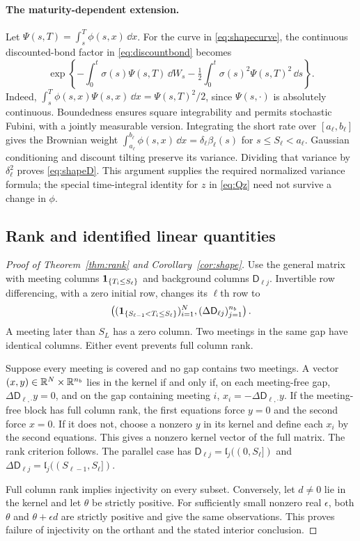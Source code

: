 \paragraph{The maturity-dependent extension.}
Let $\Psi(s,T)=\int_s^T\phi(s,x)\,\dd x$. For the curve in \eqref{eq:shapecurve}, the continuous discounted-bond factor in \eqref{eq:discountbond} becomes
\[
\exp\left\{-\int_0^t\sigma(s)\Psi(s,T)\,\dd W_s
            -\tfrac12\int_0^t\sigma(s)^2\Psi(s,T)^2\,\dd s\right\}.
\]
Indeed, $\int_s^T\phi(s,x)\Psi(s,x)\,\dd x=\Psi(s,T)^2/2$, since $\Psi(s,\cdot)$ is absolutely continuous. Boundedness ensures square integrability and permits stochastic Fubini, with a jointly measurable version. Integrating the short rate over $[a_\ell,b_\ell]$ gives the Brownian weight $\int_{a_\ell}^{b_\ell}\phi(s,x)\,\dd x=\delta_\ell\beta_\ell(s)$ for $s\leq S_\ell<a_\ell$. Gaussian conditioning and discount tilting preserve its variance. Dividing that variance by $\delta_\ell^2$ proves \eqref{eq:shapeD}. This argument supplies the required normalized variance formula; the special time-integral identity for $z$ in \eqref{eq:Qz} need not survive a change in $\phi$.

\subsection{Rank and identified linear quantities}\label{app:rank}
\begin{proof}[Proof of Theorem~\ref{thm:rank} and Corollary~\ref{cor:shape}]
Use the general matrix with meeting columns $\mathbf 1_{\{T_i\leq S_\ell\}}$ and background columns $\mathsf D_{\ell j}$. Invertible row differencing, with a zero initial row, changes its $\ell$th row to
\[
\left((\mathbf 1_{\{S_{\ell-1}<T_i\leq S_\ell\}})_{i=1}^N,
                                  (\Delta \mathsf D_{\ell j})_{j=1}^{n_b}\right).
\]
A meeting later than $S_L$ has a zero column. Two meetings in the same gap have identical columns. Either event prevents full column rank.

Suppose every meeting is covered and no gap contains two meetings. A vector $(x,y)\in\mathbb R^N\times\mathbb R^{n_b}$ lies in the kernel if and only if, on each meeting-free gap, $\Delta \mathsf D_{\ell,\cdot}y=0$, and on the gap containing meeting $i$, $x_i=-\Delta \mathsf D_{\ell,\cdot}y$. If the meeting-free block has full column rank, the first equations force $y=0$ and the second force $x=0$. If it does not, choose a nonzero $y$ in its kernel and define each $x_i$ by the second equations. This gives a nonzero kernel vector of the full matrix. The rank criterion follows. The parallel case has $\mathsf D_{\ell j}=\mathfrak l_j((0,S_\ell])$ and $\Delta \mathsf D_{\ell j}=\mathfrak l_j((S_{\ell-1},S_\ell])$.

Full column rank implies injectivity on every subset. Conversely, let $d\ne0$ lie in the kernel and let $\theta$ be strictly positive. For sufficiently small nonzero real $\epsilon$, both $\theta$ and $\theta+\epsilon d$ are strictly positive and give the same observations. This proves failure of injectivity on the orthant and the stated interior conclusion.
\end{proof}

